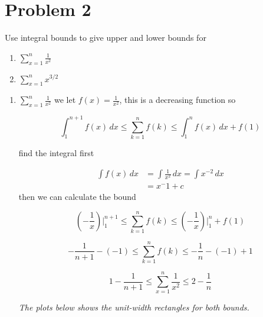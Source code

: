 \vspace{1em}
\hrulefill

\section*{Problem 2}
Use integral bounds to give upper and lower bounds for
\begin{enumerate}[label=\arabic*.]
    \item $\displaystyle \sum_{x=1}^n \frac{1}{x^2}$
    \item $\displaystyle \sum_{x=1}^n x^{3/2}$
\end{enumerate}
\medskip
\solution

\begin{enumerate}[label=\arabic*.]
    \item $\displaystyle \sum_{x=1}^n \frac{1}{x^2}$ we let $f(x)=\frac{1}{x^2}$, this is a decreasing function so

    \[
        \int_{1}^{n+1} f(x)\,dx \le \sum_{k=1}^n f(k) \le \int_{1}^{n} f(x)\,dx + f(1)
    \]

    find the integral first

    \begin{align*}
    \int f(x)\,dx &= \int \frac{1}{x^2}\,dx = \int x^{-2}\,dx \\
        &= x^-1 + c
    \end{align*}
    then we can calculate the bound

    \[
        \left(-\frac{1}{x}\right)\Bigg\rvert_{1}^{n+1} \le \sum_{k=1}^n f(k) \le \left(-\frac{1}{x}\right)\Bigg\rvert_{1}^{n} + f(1)
    \]

    \[
        -\frac{1}{n+1} - (-1) \le \sum_{k=1}^n f(k) \le -\frac{1}{n} - (-1) + 1
    \]

    \[
        \boxed{1 - \frac{1}{n+1} \le \sum_{x=1}^n \frac{1}{x^2} \le 2 - \frac{1}{n}}
    \]

    \begin{center}
    \textit{The plots below shows the unit-width rectangles for both bounds.}
    \begin{minipage}{0.45\linewidth}
        \centering


\end{minipage}
\end{center}
\end{enumerate}
